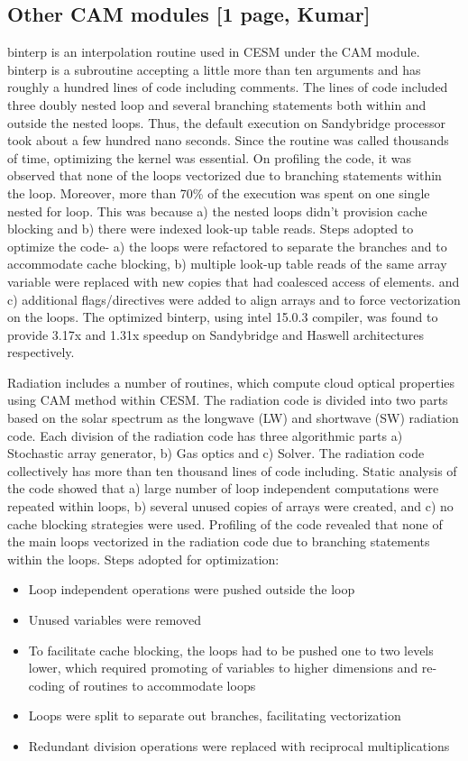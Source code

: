 \subsection{Other CAM modules [1 page, Kumar]}\label{sec:other}

binterp is an interpolation routine used in CESM under the CAM module. binterp is a subroutine accepting a little more than ten arguments and has roughly a hundred lines of code including comments. The  lines of code included three doubly nested loop and several branching statements both within and outside the nested loops. Thus, the default execution on Sandybridge processor took about a few hundred nano seconds. Since the routine was called thousands of time, optimizing the kernel was essential.
On profiling the code, it was observed that none of the loops vectorized due to branching statements within the loop. Moreover, more than 70\% of the execution was spent on one single nested for loop. This was because a) the nested loops didn't provision cache blocking and b) there were indexed look-up table reads. Steps adopted to optimize the code- a) the loops were refactored to separate the branches and to accommodate cache blocking, b) multiple look-up table reads of the same array variable were replaced with new copies that had coalesced access of elements. and c) additional flags/directives were added to align arrays and to force vectorization on the loops. 
The optimized binterp, using intel 15.0.3 compiler, was found to provide 3.17x and 1.31x speedup on Sandybridge and Haswell architectures respectively. 

Radiation includes a number of routines, which compute cloud optical properties using CAM method within CESM. The radiation code is divided into two parts based on the solar spectrum as the longwave (LW) and shortwave (SW) radiation code. Each division of the radiation code has three algorithmic parts a) Stochastic array generator, b) Gas optics and c) Solver. The radiation code collectively has more than ten thousand lines of code including. Static analysis of the code showed that a) large number of loop independent computations were repeated within loops, b) several unused copies of arrays were created, and c) no cache blocking strategies were used. 
Profiling of the code revealed that none of the main loops vectorized in the radiation code due to branching statements within the loops. Steps adopted for optimization:
\begin {itemize}
\item {Loop independent operations were pushed outside the loop}
\item {Unused variables were removed}
\item {To facilitate cache blocking, the loops had to be pushed one to two levels lower, which required promoting of variables to higher dimensions and re-coding of routines to accommodate loops}
\item {Loops were split to separate out branches, facilitating vectorization}
\item {Redundant division operations were replaced with reciprocal multiplications}
\end{itemize}

